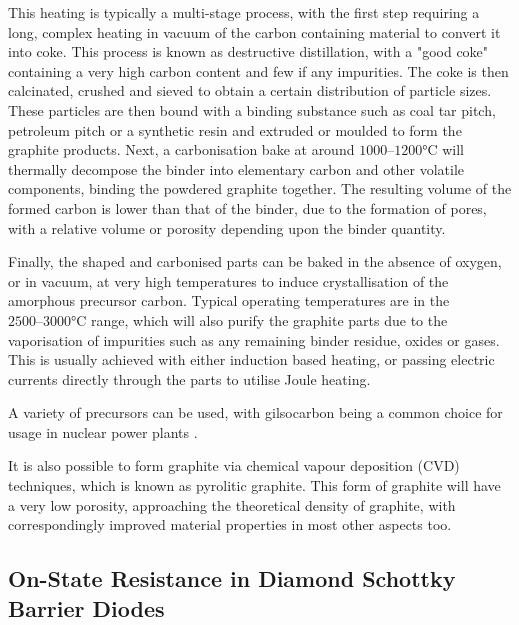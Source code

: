 This heating is typically a multi-stage process, with the first step requiring a long, complex heating in vacuum of the carbon containing material to convert it into coke. This process is known as destructive distillation, with a "good coke" containing a very high carbon content and few if any impurities. The coke is then calcinated, crushed and sieved to obtain a certain distribution of particle sizes. These particles are then bound with a binding substance such as coal tar pitch, petroleum pitch or a synthetic resin and extruded or moulded to form the graphite products. Next, a carbonisation bake at around $1000\text{--}1200\si{\degreeCelsius}$ will thermally decompose the binder into elementary carbon and other volatile components, binding the powdered graphite together. The resulting volume of the formed carbon is lower than that of the binder, due to the formation of pores, with a relative volume or porosity depending upon the binder quantity.

Finally, the shaped and carbonised parts can be baked in the absence of oxygen, or in vacuum, at very high temperatures to induce crystallisation of the amorphous precursor carbon. Typical operating temperatures are in the $2500\text{--}3000\si{\degreeCelsius}$ range, which will also purify the graphite parts due to the vaporisation of impurities such as any remaining binder residue, oxides or gases. This is usually achieved with either induction based heating, or passing electric currents directly through the parts to utilise Joule heating.

A variety of precursors can be used, with gilsocarbon being a common choice for usage in nuclear power plants \cite{liu2017}.

It is also possible to form graphite via chemical vapour deposition (CVD) techniques, which is known as pyrolitic graphite. This form of graphite will have a very low porosity, approaching the theoretical density of graphite, with correspondingly improved material properties in most other aspects too.


\subsection{On-State Resistance in Diamond Schottky Barrier Diodes}

